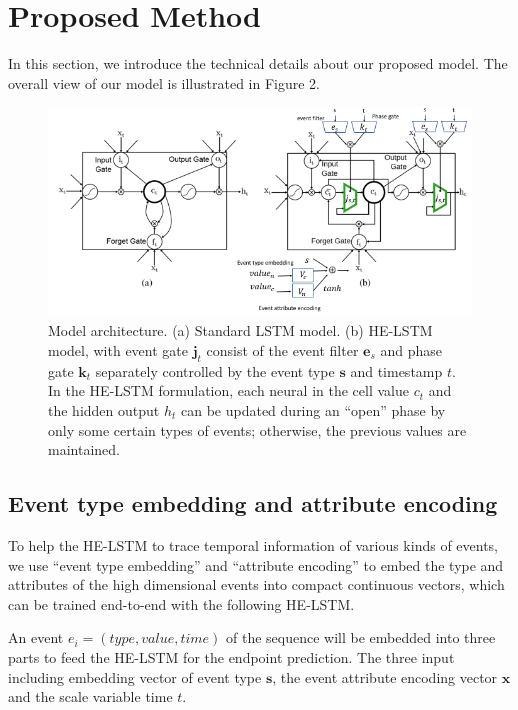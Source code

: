 \documentclass[letterpaper]{article} %
\begin{document}
\section{Proposed Method}





In this section, we introduce the technical details about our proposed model. The overall view of our model is illustrated in Figure 2.



\begin{figure}[!t]
\centering

\includegraphics[width=.7\textwidth]{model.png}

\caption{Model architecture. (a) Standard LSTM model. (b) HE-LSTM model, with event gate $\bm j_t$ consist of the event filter $\bm e_s$ and phase gate $\bm k_t$
separately controlled by  the event type $\bm s$ and timestamp $t$. In the HE-LSTM formulation, each neural in the cell value $c_t$ and the hidden output
$h_t$ can be updated during an ``open'' phase by only some certain  types of events; otherwise, the previous values are maintained.}
\label{fig:overview}

\end{figure}



\subsection{Event type embedding and attribute encoding}
To help the HE-LSTM to trace temporal information of various kinds of events, we use ``event type embedding'' and ``attribute encoding'' to embed the type and attributes of the high dimensional events into compact continuous vectors, which can be trained end-to-end with the following HE-LSTM.

An event $e_i = (type,value,time)$ of the sequence will be embedded into three parts to feed the HE-LSTM for the endpoint prediction. The three input including  embedding vector of event type $\bm s$, the event attribute encoding vector $\bm x$ and the scale variable time $t$.
\end{document}
